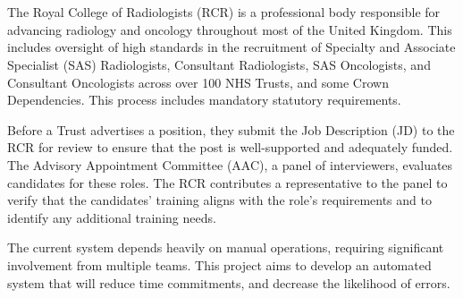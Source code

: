 \section*{}
\vspace{10pt}

The Royal College of Radiologists (RCR) is a professional body responsible for advancing radiology and oncology throughout most of the United Kingdom. This includes oversight of high standards in the recruitment of Specialty and Associate Specialist (SAS) Radiologists, Consultant Radiologists, SAS Oncologists, and Consultant Oncologists across over 100 NHS Trusts, and some Crown Dependencies. This process includes mandatory statutory requirements.

Before a Trust advertises a position, they submit the Job Description (JD) to the RCR for review to ensure that the post is well-supported and adequately funded. The Advisory Appointment Committee (AAC), a panel of interviewers, evaluates candidates for these roles. The RCR contributes a representative to the panel to verify that the candidates' training aligns with the role's requirements and to identify any additional training needs.

The current system depends heavily on manual operations, requiring significant involvement from multiple teams. This project aims to develop an automated system that will reduce time commitments, and decrease the likelihood of errors.